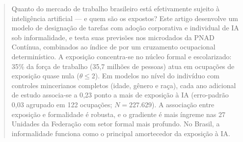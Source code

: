 \begin{abstract}
\noindent
Quanto do mercado de trabalho brasileiro está efetivamente sujeito à inteligência artificial --- e quem são os expostos? Este artigo desenvolve um modelo de designação de tarefas com adoção corporativa e individual de IA sob informalidade, e testa suas previsões nos microdados da PNAD Contínua, combinados ao índice de \citet{eloundou2024gpts} por um cruzamento ocupacional determinístico. A exposição concentra-se no núcleo formal e escolarizado: 35\% da força de trabalho (35{,}7 milhões de pessoas) atua em ocupações de exposição quase nula ($\theta \le 2$). Em modelos no nível do indivíduo com controles mincerianos completos (idade, gênero e raça), cada ano adicional de estudo associa-se a 0{,}23 ponto a mais de exposição à IA (erro-padrão 0{,}03 agrupado em 122 ocupações; $N = 227.629$). A associação entre exposição e formalidade é robusta, e o gradiente é mais íngreme nas 27 Unidades da Federação com setor formal mais profundo. No Brasil, a informalidade funciona como o principal amortecedor da exposição à IA.
\end{abstract}
